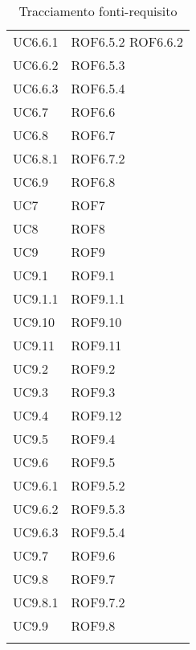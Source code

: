 \begin{longtable}{p{2.5cm}!{\VRule[1pt]}p{2.5cm}}
	UC6.6.1 & ROF6.5.2 \newline ROF6.6.2\\
	UC6.6.2 & ROF6.5.3\\
	UC6.6.3 & ROF6.5.4\\
	UC6.7 & ROF6.6\\
	UC6.8 & ROF6.7\\
	UC6.8.1 & ROF6.7.2\\
	UC6.9 & ROF6.8\\
	UC7 & ROF7\\
	UC8 & ROF8\\
	UC9 & ROF9\\
	UC9.1 & ROF9.1\\
	UC9.1.1 & ROF9.1.1\\
	UC9.10 & ROF9.10\\
	UC9.11 & ROF9.11\\
	UC9.2 & ROF9.2\\
	UC9.3 & ROF9.3\\
	UC9.4 & ROF9.12\\
	UC9.5 & ROF9.4\\
	UC9.6 & ROF9.5\\
	UC9.6.1 & ROF9.5.2\\
	UC9.6.2 & ROF9.5.3\\
	UC9.6.3 & ROF9.5.4\\
	UC9.7 & ROF9.6\\
	UC9.8 & ROF9.7\\
	UC9.8.1 & ROF9.7.2\\
	UC9.9 & ROF9.8\\
	\caption{Tracciamento fonti-requisito}
\end{longtable}